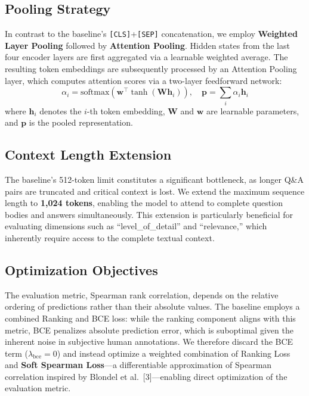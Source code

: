 \documentclass{article}
\begin{document}
\subsection{Pooling Strategy}
In contrast to the baseline's \texttt{[CLS]}+\texttt{[SEP]} concatenation, we employ \textbf{Weighted Layer Pooling} followed by \textbf{Attention Pooling}. Hidden states from the last four encoder layers are first aggregated via a learnable weighted average. The resulting token embeddings are subsequently processed by an Attention Pooling layer, which computes attention scores via a two-layer feedforward network:
\begin{equation}
    \alpha_i = \text{softmax}\left(\mathbf{w}^\top \tanh(\mathbf{W} \mathbf{h}_i)\right), \quad \mathbf{p} = \sum_{i} \alpha_i \mathbf{h}_i
\end{equation}
where $\mathbf{h}_i$ denotes the $i$-th token embedding, $\mathbf{W}$ and $\mathbf{w}$ are learnable parameters, and $\mathbf{p}$ is the pooled representation.

\subsection{Context Length Extension}
The baseline's 512-token limit constitutes a significant bottleneck, as longer Q\&A pairs are truncated and critical context is lost. We extend the maximum sequence length to \textbf{1,024 tokens}, enabling the model to attend to complete question bodies and answers simultaneously. This extension is particularly beneficial for evaluating dimensions such as ``level\_of\_detail'' and ``relevance,'' which inherently require access to the complete textual context.

\subsection{Optimization Objectives}
The evaluation metric, Spearman rank correlation, depends on the relative ordering of predictions rather than their absolute values. The baseline employs a combined Ranking and BCE loss: while the ranking component aligns with this metric, BCE penalizes absolute prediction error, which is suboptimal given the inherent noise in subjective human annotations. We therefore discard the BCE term ($\lambda_{\text{bce}}=0$) and instead optimize a weighted combination of Ranking Loss and \textbf{Soft Spearman Loss}---a differentiable approximation of Spearman correlation inspired by Blondel et al.\ [3]---enabling direct optimization of the evaluation metric.
\end{document}
